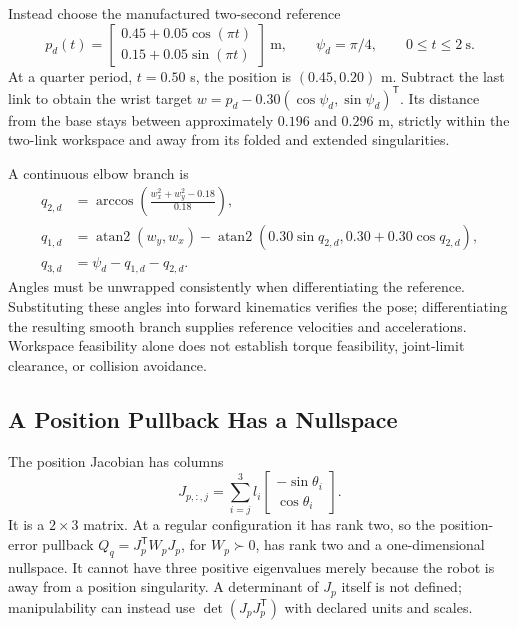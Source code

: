 Instead choose the manufactured two-second reference
\begin{equation}
 p_d(t)=\begin{bmatrix}0.45+0.05\cos(\pi t)\\0.15+0.05\sin(\pi t)\end{bmatrix}\ \mathrm{m},
 \qquad \psi_d=\pi/4,\qquad 0\le t\le2\ \mathrm{s}.
\end{equation}
At a quarter period, $t=0.50$ s, the position is $(0.45,0.20)$ m. Subtract the last link to obtain the wrist target $w=p_d-0.30(\cos\psi_d,\sin\psi_d)^{\mathsf T}$. Its distance from the base stays between approximately $0.196$ and $0.296$ m, strictly within the two-link workspace and away from its folded and extended singularities.

A continuous elbow branch is
\begin{equation}
\begin{aligned}
 q_{2,d}&=\arccos\left(\frac{w_x^2+w_y^2-0.18}{0.18}\right),\\
 q_{1,d}&=\operatorname{atan2}(w_y,w_x)
 -\operatorname{atan2}(0.30\sin q_{2,d},0.30+0.30\cos q_{2,d}),\\
 q_{3,d}&=\psi_d-q_{1,d}-q_{2,d}.
\end{aligned}
\end{equation}
Angles must be unwrapped consistently when differentiating the reference. Substituting these angles into forward kinematics verifies the pose; differentiating the resulting smooth branch supplies reference velocities and accelerations. Workspace feasibility alone does not establish torque feasibility, joint-limit clearance, or collision avoidance.

\subsection{A Position Pullback Has a Nullspace}

The position Jacobian has columns
\begin{equation}
 J_{p,:,j}=\sum_{i=j}^3 l_i\begin{bmatrix}-\sin\theta_i\\\cos\theta_i\end{bmatrix}.
\end{equation}
It is a $2\times3$ matrix. At a regular configuration it has rank two, so the position-error pullback $Q_q=J_p^{\mathsf T}W_pJ_p$, for $W_p\succ0$, has rank two and a one-dimensional nullspace. It cannot have three positive eigenvalues merely because the robot is away from a position singularity. A determinant of $J_p$ itself is not defined; manipulability can instead use $\det(J_pJ_p^{\mathsf T})$ with declared units and scales.

